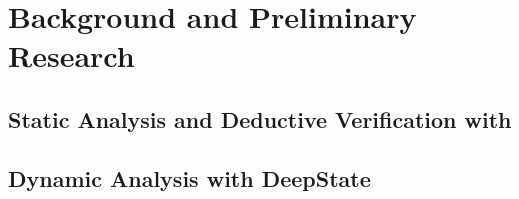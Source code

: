 \section{Background and Preliminary Research}

\subsection{Static Analysis and Deductive Verification with \framac}


\subsection{Dynamic Analysis with DeepState}



